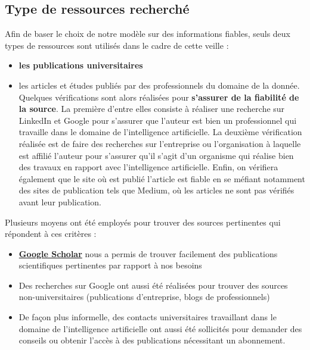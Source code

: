 \documentclass[french]{article}
\begin{document}
    \subsection{Type de ressources recherché}
    Afin de baser le choix de notre modèle sur des informations fiables, seuls deux types de ressources sont utilisés dans le cadre de cette veille :
    \begin{itemize}
        \item \textbf{les publications universitaires}
        \item les articles et études publiés par des professionnels du domaine de la donnée. Quelques vérifications sont alors réalisées pour \textbf{s'assurer de la fiabilité de la source}. La première d'entre elles consiste à réaliser une recherche sur LinkedIn et Google pour s'assurer que l'auteur est bien un professionnel qui travaille dans le domaine de l'intelligence artificielle. La deuxième vérification réalisée est de faire des recherches sur l'entreprise ou l'organisation à laquelle est affilié l'auteur pour s'assurer qu'il s'agit d'un organisme qui réalise bien des travaux en rapport avec l'intelligence artificielle. Enfin, on vérifiera également que le site où est publié l'article est fiable en se méfiant notamment des sites de publication tels que Medium, où les articles ne sont pas vérifiés avant leur publication.
    \end{itemize}
    Plusieurs moyens ont été employés pour trouver des sources pertinentes qui répondent à ces critères :
    \begin{itemize}
        \item \textbf{\href{https://scholar.google.com/}{Google Scholar}} nous a permis de trouver facilement des publications scientifiques pertinentes par rapport à nos besoins
        \item Des recherches sur Google ont aussi été réalisées pour trouver des sources non-universitaires (publications d'entreprise, blogs de professionnels)
        \item De façon plus informelle, des contacts universitaires travaillant dans le domaine de l'intelligence artificielle ont aussi été sollicités pour demander des conseils ou obtenir l'accès à des publications nécessitant un abonnement.
    \end{itemize}
\end{document}
